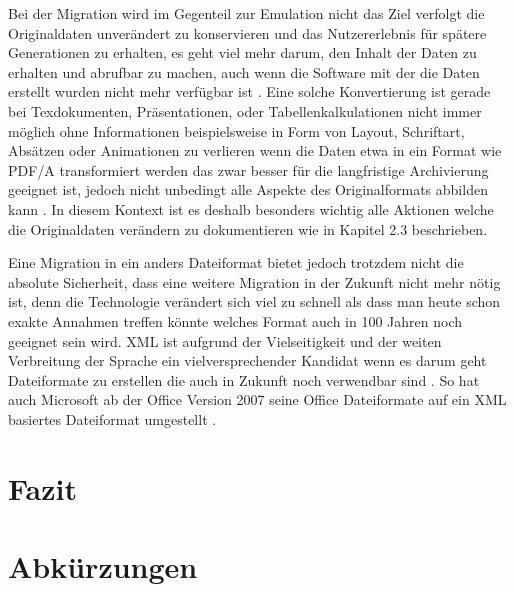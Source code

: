 \documentclass[conference,compsoc,final,a4paper]{IEEEtran}
\begin{document}
Bei der Migration wird im Gegenteil zur Emulation nicht das Ziel verfolgt die Originaldaten unverändert zu konservieren und das Nutzererlebnis für spätere Generationen zu erhalten, es geht viel mehr darum, den Inhalt der Daten zu erhalten und abrufbar zu machen, auch wenn die Software mit der die Daten erstellt wurden nicht mehr verfügbar ist \autocite{Lee2002}. Eine solche Konvertierung ist gerade bei Texdokumenten, Präsentationen, oder Tabellenkalkulationen nicht immer möglich ohne Informationen beispielsweise in Form von Layout, Schriftart, Absätzen oder Animationen zu verlieren wenn die Daten etwa in ein Format wie \acs{PDF}/A transformiert werden das zwar besser für die langfristige Archivierung geeignet ist, jedoch nicht unbedingt alle Aspekte des Originalformats abbilden kann \autocite{Reichherzer2006}. In diesem Kontext ist es deshalb besonders wichtig alle Aktionen welche die Originaldaten verändern zu dokumentieren wie in Kapitel 2.3 beschrieben.

Eine Migration in ein anders Dateiformat bietet jedoch trotzdem nicht die absolute Sicherheit, dass eine weitere Migration in der Zukunft nicht mehr nötig ist, denn die Technologie verändert sich viel zu schnell als dass man heute schon exakte Annahmen treffen könnte welches Format auch in 100 Jahren noch geeignet sein wird. \ac{XML} ist aufgrund der Vielseitigkeit und der weiten Verbreitung der Sprache ein vielversprechender Kandidat wenn es darum geht Dateiformate zu erstellen die auch in Zukunft noch verwendbar sind \autocite{Lee2002}. So hat auch Microsoft ab der Office Version 2007 seine Office Dateiformate auf ein \acs{XML} basiertes Dateiformat umgestellt \autocite{MSOpenXML}.

\section{Fazit}


\section*{Abkürzungen}

\begin{acronym}[D-SDA]
\end{acronym}

\nocite{*} %
\printbibliography
\end{document}
